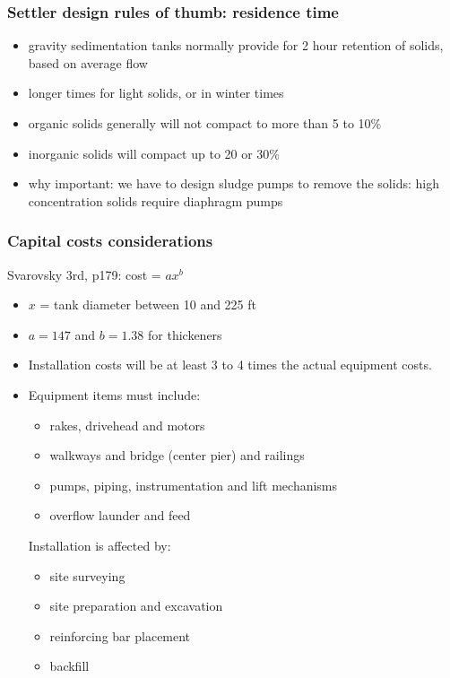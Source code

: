 \begin{frame}\frametitle{Settler design rules of thumb: residence time}
	\begin{itemize}
		\item	gravity sedimentation tanks normally provide for 2 hour retention of solids, based on average flow
		\item	longer times for light solids, or in winter times
		\item	organic solids generally will not compact to more than 5 to 10\%
		\item	inorganic solids will compact up to 20 or 30\%
		\item	why important: we have to design sludge pumps to remove the solids: high concentration solids require diaphragm pumps
	\end{itemize}
\end{frame}

% 

\begin{frame}\frametitle{Capital costs considerations}
	Svarovsky 3rd, p179: cost = $a x^b$
	\begin{itemize}
		\item	$x$ = tank diameter between 10 and 225 ft
		\item	$a=147$ and $b=1.38$ for thickeners
	\end{itemize}

	\begin{itemize}
		\item	Installation costs will be at least 3 to 4 times the actual equipment costs.
		\item	Equipment items must include:
		\begin{itemize}
			\item	rakes, drivehead and motors
			\item	walkways and bridge (center pier) and railings
			\item	pumps, piping, instrumentation and lift mechanisms
			\item	overflow launder and feed
		\end{itemize}
		Installation is affected by:
		\begin{itemize}
			\item	site surveying
			\item	site preparation and excavation
			\item	reinforcing bar placement
			\item	backfill
		\end{itemize}
	\end{itemize}
\end{frame}

